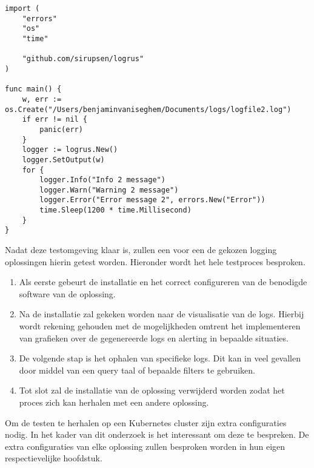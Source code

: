 \begin{lstlisting}[caption=Log generator 2 main function ]
import (
    "errors"
    "os"
    "time"
    
    "github.com/sirupsen/logrus"
)

func main() {
    w, err := os.Create("/Users/benjaminvaniseghem/Documents/logs/logfile2.log")
    if err != nil {
        panic(err)
    }
    logger := logrus.New()
    logger.SetOutput(w)
    for {
        logger.Info("Info 2 message")
        logger.Warn("Warning 2 message")
        logger.Error("Error message 2", errors.New("Error"))
        time.Sleep(1200 * time.Millisecond)
    }
}
\end{lstlisting}

Nadat deze testomgeving klaar is, zullen een voor een de gekozen logging oplossingen hierin getest worden. Hieronder wordt het hele testproces besproken.
\begin{enumerate}
    \item Als eerste gebeurt de installatie en het correct configureren van de benodigde software van de oplossing. 
    \item Na de installatie zal gekeken worden naar de visualisatie van de logs. Hierbij wordt rekening gehouden met de mogelijkheden omtrent het implementeren van grafieken over de gegenereerde logs en alerting in bepaalde situaties.
    \item De volgende stap is het ophalen van specifieke logs. Dit kan in veel gevallen door middel van een query taal of bepaalde filters te gebruiken.
    \item Tot slot zal de installatie van de oplossing verwijderd worden zodat het proces zich kan herhalen met een andere oplossing.
\end{enumerate}

Om de testen te herhalen op een Kubernetes cluster zijn extra configuraties nodig. In het kader van dit onderzoek is het interessant om deze te bespreken. De extra configuraties van elke oplossing zullen besproken worden in hun eigen respectievelijke hoofdstuk.

